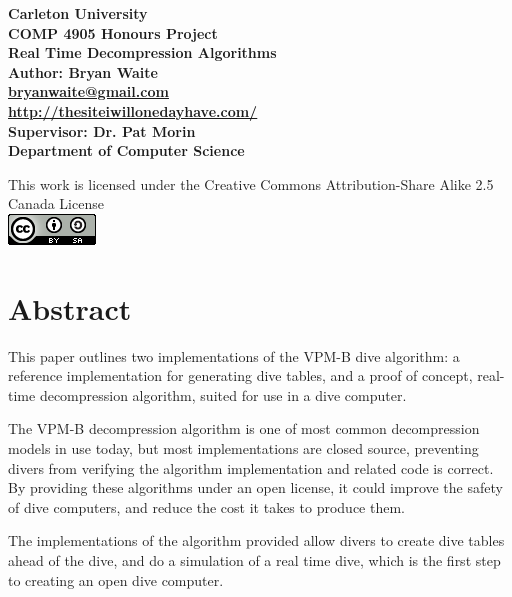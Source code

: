 \documentclass[12pt]{article}
\begin{document}
 

\begin{titlepage}
\begin{center}
\large{\textbf{Carleton University}\\
\textbf{COMP 4905 Honours Project}\\
\textbf{Real Time Decompression Algorithms}\\
\textbf{Author: Bryan Waite}\\
\textbf{\color{blue}\uline{\href{mailto:bryanwaite@gmail.com}{bryanwaite@gmail.com}}}\\
\textbf{\color{blue}\uline{\href{http://thesiteiwillonedayhave.com/}{http://thesiteiwillonedayhave.com/}}}\\
\textbf{Supervisor: Dr. Pat Morin}\\
\textbf{Department of Computer Science}}\\
\date{\today}

\vfill
This work is licensed under the Creative Commons Attribution-Share Alike 2.5 Canada License \\
\includegraphics{cc_by_sa.png}
\end{center}
\end{titlepage}

\newpage

\section*{Abstract}
\small{This paper outlines two implementations of the VPM-B dive algorithm: a reference implementation for
  generating dive tables, and a proof of concept, real-time decompression algorithm, suited for
  use in a dive computer.

  The VPM-B decompression algorithm is one of most common decompression models in use today, but most
  implementations are closed source, preventing divers from verifying the algorithm implementation and related code
  is correct. By providing these algorithms under an open license, it could improve the safety of dive
  computers, and reduce the cost it takes to produce them.

  The implementations of the algorithm provided allow divers to create dive tables ahead of the dive, and
  do a simulation of a real time dive, which is the first step to creating an open dive computer.
}
\end{document}
